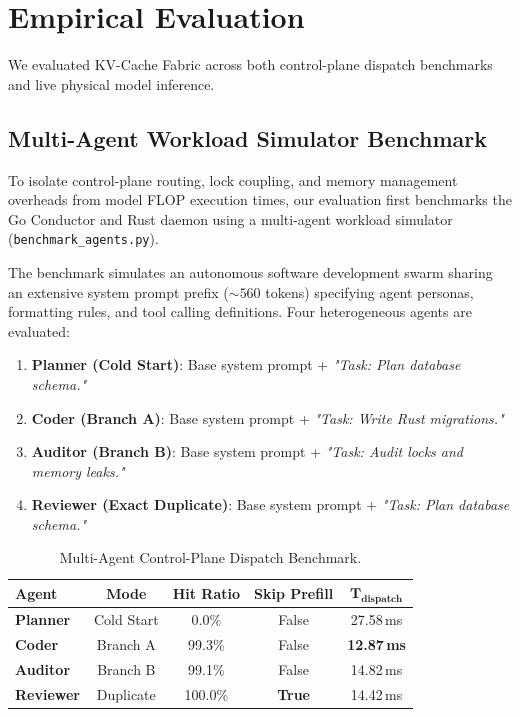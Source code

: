\documentclass[10pt,twocolumn,letterpaper]{article}
\begin{document}
\section{Empirical Evaluation}

We evaluated KV-Cache Fabric across both control-plane dispatch benchmarks and live physical model inference.

\subsection{Multi-Agent Workload Simulator Benchmark}
To isolate control-plane routing, lock coupling, and memory management overheads from model FLOP execution times, our evaluation first benchmarks the Go Conductor and Rust daemon using a multi-agent workload simulator (\texttt{benchmark\_agents.py}).

The benchmark simulates an autonomous software development swarm sharing an extensive system prompt prefix ($\sim 560$ tokens) specifying agent personas, formatting rules, and tool calling definitions. Four heterogeneous agents are evaluated:
\begin{enumerate}
    \item \textbf{Planner (Cold Start)}: Base system prompt + \textit{"Task: Plan database schema."}
    \item \textbf{Coder (Branch A)}: Base system prompt + \textit{"Task: Write Rust migrations."}
    \item \textbf{Auditor (Branch B)}: Base system prompt + \textit{"Task: Audit locks and memory leaks."}
    \item \textbf{Reviewer (Exact Duplicate)}: Base system prompt + \textit{"Task: Plan database schema."}
\end{enumerate}

\begin{table}[h]
\centering
\small
\caption{Multi-Agent Control-Plane Dispatch Benchmark.}
\label{tab:control_plane}
\begin{tabularx}{\columnwidth}{lcccc}
\toprule
\textbf{Agent} & \textbf{Mode} & \textbf{Hit Ratio} & \textbf{Skip Prefill} & $\mathbf{T_{\text{dispatch}}}$ \\
\midrule
\textbf{Planner}  & Cold Start & 0.0\%  & False & 27.58\,ms \\
\textbf{Coder}    & Branch A   & 99.3\% & False & \textbf{12.87\,ms} \\
\textbf{Auditor}  & Branch B   & 99.1\% & False & 14.82\,ms \\
\textbf{Reviewer} & Duplicate  & 100.0\%& \textbf{True}  & 14.42\,ms \\
\bottomrule
\end{tabularx}
\end{table}
\end{document}

